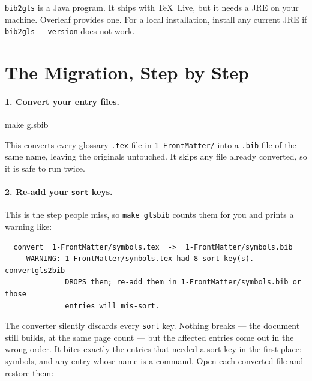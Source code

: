 \begin{warningbox}[title={New requirement: Java}]
  \texttt{bib2gls} is a Java program.  It ships with \TeX~Live, but it needs a
  \gls{JRE} on your machine.  Overleaf provides one.  For a local
  installation, install any current \gls{JRE} if \verb!bib2gls --version!
  does not work.
\end{warningbox}

\section{The Migration, Step by Step}
\label{sec:migration_steps}

\paragraph{1. Convert your entry files.}
\begin{bashcode}
make glsbib
\end{bashcode}

This converts every glossary \texttt{.tex} file in \verb!1-FrontMatter/! into
a \texttt{.bib} file of the same name, leaving the originals untouched.  It
skips any file already converted, so it is safe to run twice.

\paragraph{2. Re-add your \texttt{sort} keys.}  This is the step people miss,
so \verb!make glsbib! counts them for you and prints a warning like:

\begin{verbatim}
  convert  1-FrontMatter/symbols.tex  ->  1-FrontMatter/symbols.bib
     WARNING: 1-FrontMatter/symbols.tex had 8 sort key(s). convertgls2bib
              DROPS them; re-add them in 1-FrontMatter/symbols.bib or those
              entries will mis-sort.
\end{verbatim}

The converter silently discards every \texttt{sort} key.  Nothing breaks ---
the document still builds, at the same page count --- but the affected
entries come out in the wrong order.  It bites exactly the entries that
needed a sort key in the first place: symbols, and any entry whose name is a
command.  Open each converted file and restore them:

